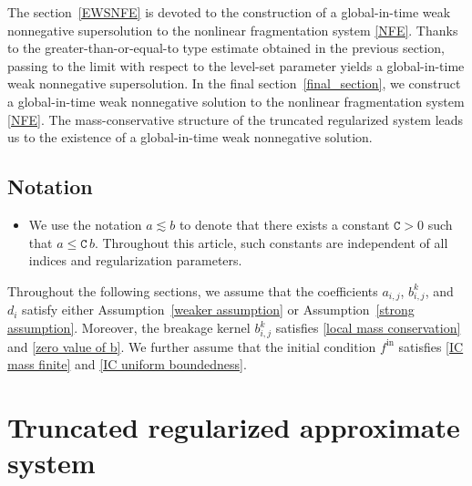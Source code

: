 \documentclass[a4paper,12pt,reqno]{amsart}
\theoremstyle{plain}
\numberwithin{equation}{section}
\begin{document}
	\newline
	The section~\ref{EWSNFE} is devoted to the construction of a global-in-time weak
	nonnegative supersolution to the nonlinear fragmentation system \eqref{NFE}. Thanks to the
	greater-than-or-equal-to type estimate obtained in the previous section, passing to the
	limit with respect to the level-set parameter yields a global-in-time weak nonnegative
	supersolution.
	\newline
	In the final section~\ref{final_section}, we construct a global-in-time weak
	nonnegative solution to the nonlinear fragmentation system \eqref{NFE}. The
	mass-conservative structure of the truncated regularized system leads us to the existence of a global-in-time weak nonnegative solution.
	
	
	
	
	
	\subsection{Notation}
	\begin{itemize}
		\item [$\bullet$] We use the notation $a \lesssim b$ to denote that there exists a constant $\texttt{C} > 0$
		such that $a \le \texttt{C}\, b$. Throughout this article, such constants are independent of all indices and regularization parameters.
	\end{itemize}
	
	Throughout the following sections, we assume that the coefficients
	$a_{i,j}$, $b_{i,j}^k$, and $d_i$ satisfy either Assumption~\ref{weaker assumption}
	or Assumption~\ref{strong assumption}. Moreover, the breakage kernel
	$b_{i,j}^k$ satisfies \eqref{local mass conservation} and
	\eqref{zero value of b}. We further assume that the initial condition
	$f^{\mathrm{in}}$ satisfies \eqref{IC mass finite} and
	\eqref{IC uniform boundedness}.
	
	
	
	
	\section{\textbf{Truncated regularized approximate system}}\label{TRAS}
	
\end{document}
